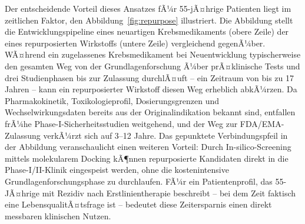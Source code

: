 ﻿\documentclass[12pt,a4paper]{article}
\theoremstyle{definition}
\begin{document}
Der entscheidende Vorteil dieses Ansatzes fÃ¼r 55-jÃ¤hrige Patienten liegt im
zeitlichen Faktor, den Abbildung~\ref{fig:repurpose} illustriert. Die Abbildung
stellt die Entwicklungspipeline eines neuartigen Krebsmedikaments (obere Zeile)
der eines repurposierten Wirkstoffs (untere Zeile) vergleichend gegenÃ¼ber. WÃ¤hrend
ein zugelassenes Krebsmedikament bei Neuentwicklung typischerweise den gesamten
Weg von der Grundlagenforschung Ã¼ber prÃ¤klinische Tests und drei Studienphasen bis
zur Zulassung durchlÃ¤uft -- ein Zeitraum von bis zu 17 Jahren \cite{mccabe2015} --
kann ein repurposierter Wirkstoff diesen Weg erheblich abkÃ¼rzen. Da Pharmakokinetik,
Toxikologieprofil, Dosierungsgrenzen und Wechselwirkungsdaten bereits aus der
Originalindikation bekannt sind, entfallen frÃ¼he Phase-I-Sicherheitsstudien
weitgehend, und der Weg zur FDA/EMA-Zulassung verkÃ¼rzt sich auf 3--12 Jahre.
Das gepunktete Verbindungspfeil in der Abbildung veranschaulicht einen weiteren
Vorteil: Durch In-silico-Screening mittels molekularem Docking kÃ¶nnen repurposierte
Kandidaten direkt in die Phase-I/II-Klinik eingespeist werden, ohne die
kostenintensive Grundlagenforschungsphase zu durchlaufen. FÃ¼r ein Patientenprofil,
das 55-JÃ¤hrige mit Rezidiv nach Erstlinientherapie beschreibt -- bei dem Zeit
faktisch eine LebensqualitÃ¤tsfrage ist -- bedeutet diese Zeitersparnis einen
direkt messbaren klinischen Nutzen.
\end{document}
